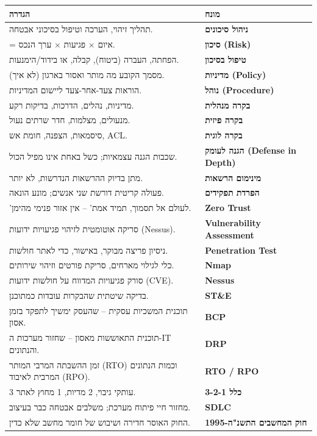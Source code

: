 \documentclass[11pt]{article}
\newcommand{\enLR}[1]{\textenglish{#1}}
\begin{document}
\begin{xltabular}{\linewidth}{|>{\setRTL\raggedleft\arraybackslash}X|>{\setRTL\raggedleft\arraybackslash}X|}
\hline
{}\textbf{הגדרה} & \textbf{מונח} \\
\hline
\endhead
תהליך זיהוי, הערכה וטיפול בסיכוני אבטחה. & \textbf{ניהול סיכונים} \\
\hline
= איום × פגיעות × ערך הנכס. & \textbf{סיכון \enLR{(Risk)}} \\
\hline
הפחתה, העברה (ביטוח), קבלה, או בידוד/הימנעות. & \textbf{טיפול בסיכון} \\
\hline
מסמך הקובע מה מותר ואסור בארגון (לא איך). & \textbf{מדיניות \enLR{(Policy)}} \\
\hline
הוראות צעד-אחר-צעד ליישום המדיניות. & \textbf{נוהל \enLR{(Procedure)}} \\
\hline
מדיניות, נהלים, הדרכות, בדיקות רקע. & \textbf{בקרה מנהלית} \\
\hline
מנעולים, מצלמות, חדר שרתים נעול. & \textbf{בקרה פיזית} \\
\hline
סיסמאות, הצפנה, חומת אש, \enLR{ACL.} & \textbf{בקרה לוגית} \\
\hline
שכבות הגנה עצמאיות; כשל באחת אינו מפיל הכול. & \textbf{הגנה לעומק \enLR{(Defense in Depth)}} \\
\hline
מתן בדיוק ההרשאות הנדרשות, לא יותר. & \textbf{מינימום הרשאות} \\
\hline
פעולה קריטית דורשת שני אנשים; מונע הונאה. & \textbf{הפרדת תפקידים} \\
\hline
'לעולם אל תסמוך, תמיד אמת' – אין אזור פנימי מהימן. & \textbf{\enLR{Zero Trust}} \\
\hline
סריקה אוטומטית לזיהוי פגיעויות ידועות \enLR{(Nessus).} & \textbf{\enLR{Vulnerability Assessment}} \\
\hline
ניסיון פריצה מבוקר, באישור, כדי לאתר חולשות. & \textbf{\enLR{Penetration Test}} \\
\hline
כלי לגילוי מארחים, סריקת פורטים וזיהוי שירותים. & \textbf{\enLR{Nmap}} \\
\hline
סורק פגיעויות המדווח על חולשות ידועות \enLR{(CVE).} & \textbf{\enLR{Nessus}} \\
\hline
בדיקה שיטתית שהבקרות עובדות כמתוכנן. & \textbf{\enLR{ST\&E}} \\
\hline
תוכנית המשכיות עסקית – שהעסק ימשיך לתפקד בזמן אסון. & \textbf{\enLR{BCP}} \\
\hline
תוכנית התאוששות מאסון – שחזור מערכות ה-\enLR{IT} והנתונים. & \textbf{\enLR{DRP}} \\
\hline
זמן ההשבתה המרבי המותר \enLR{(RTO)} וכמות הנתונים המרבית לאיבוד \enLR{(RPO).} & \textbf{\enLR{RTO / RPO}} \\
\hline
\enLR{3} עותקי גיבוי, \enLR{2} מדיות, \enLR{1} מחוץ לאתר. & \textbf{כלל \enLR{3-2-1}} \\
\hline
מחזור חיי פיתוח מערכת; משלבים אבטחה כבר בעיצוב. & \textbf{\enLR{SDLC}} \\
\hline
החוק האוסר חדירה ושיבוש של חומר מחשב שלא כדין. & \textbf{חוק המחשבים התשנ"ה-\enLR{1995}} \\
\hline
\end{xltabular}
\end{document}
